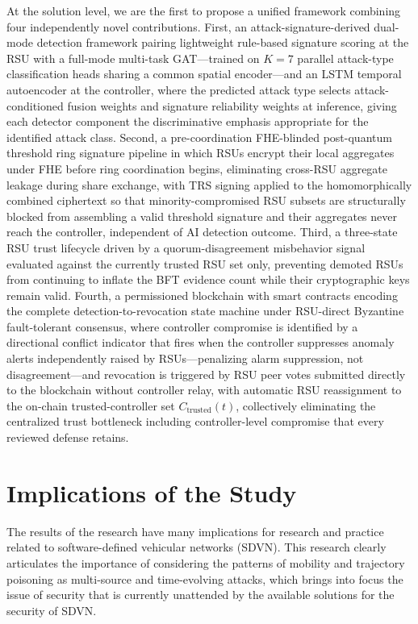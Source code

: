 \documentclass[12pt, a4paper]{report}
\begin{document}
At the solution level, we are the first to propose a unified framework combining four independently novel contributions. First, an attack-signature-derived dual-mode detection framework pairing lightweight rule-based signature scoring at the RSU with a full-mode multi-task GAT---trained on $K=7$ parallel attack-type classification heads sharing a common spatial encoder---and an LSTM temporal autoencoder at the controller, where the predicted attack type selects attack-conditioned fusion weights and signature reliability weights at inference, giving each detector component the discriminative emphasis appropriate for the identified attack class. Second, a pre-coordination FHE-blinded post-quantum threshold ring signature pipeline in which RSUs encrypt their local aggregates under FHE before ring coordination begins, eliminating cross-RSU aggregate leakage during share exchange, with TRS signing applied to the homomorphically combined ciphertext so that minority-compromised RSU subsets are structurally blocked from assembling a valid threshold signature and their aggregates never reach the controller, independent of AI detection outcome. Third, a three-state RSU trust lifecycle driven by a quorum-disagreement misbehavior signal evaluated against the currently trusted RSU set only, preventing demoted RSUs from continuing to inflate the BFT evidence count while their cryptographic keys remain valid. Fourth, a permissioned blockchain with smart contracts encoding the complete detection-to-revocation state machine under RSU-direct Byzantine fault-tolerant consensus, where controller compromise is identified by a directional conflict indicator that fires when the controller suppresses anomaly alerts independently raised by RSUs---penalizing alarm suppression, not disagreement---and revocation is triggered by RSU peer votes submitted directly to the blockchain without controller relay, with automatic RSU reassignment to the on-chain trusted-controller set $C_{\text{trusted}}(t)$, collectively eliminating the centralized trust bottleneck including controller-level compromise that every reviewed defense retains.

\section{Implications of the Study}

The results of the research have many implications for research and practice related to software-defined vehicular networks (SDVN). This research clearly articulates the importance of considering the patterns of mobility and trajectory poisoning as multi-source and time-evolving attacks, which brings into focus the issue of security that is currently unattended by the available solutions for the security of SDVN.
\end{document}
